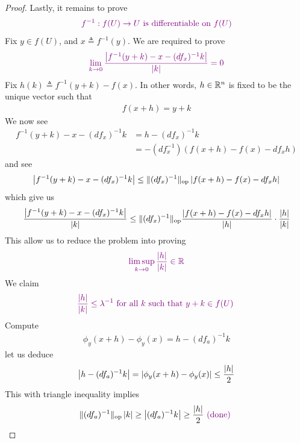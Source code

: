 \documentclass{report}
\begin{document}
\begin{proof}
Lastly, it remains to prove 
\begin{align*}
  \textcolor{violet}{f^{-1}:f(U)\rightarrow U\text{ is differentiable on $f(U)$}}
\end{align*}
Fix $y\in f(U)$, and $x\triangleq f^{-1}(y)$. We are required to prove 
\begin{align*}
  \textcolor{violet}{\lim_{k\to 0} \frac{\left|f^{-1}(y+k)-x-(df_x)^{-1}k\right|}{\left|k\right|}=0}
\end{align*}
Fix $h(k)\triangleq f^{-1}(y+k)-f(x)$. In other words, $h\in\mathbb{R}^n$ is fixed to be the unique vector such that 
\begin{align*}
f(x+h)=y+k
\end{align*}
We now see 
\begin{align*}
f^{-1}(y+k)-x-(df_x)^{-1}k&= h-(df_x)^{-1}k\\
&=-(df_x^{-1})(f(x+h)-f(x)-df_xh)
\end{align*}
and see 
\begin{align*}
\left|f^{-1}(y+k)-x-(df_x)^{-1}k\right|\leq \| (df_x)^{-1} \|_\text{op} \left|f(x+h)-f(x)-df_xh\right|
\end{align*}
which give us 
\begin{align*}
\frac{\left|f^{-1}(y+k)-x-(df_x)^{-1}k\right|}{\left|k\right|}\leq \| (df_x)^{-1} \|_\text{op} \frac{\left|f(x+h)-f(x)-df_xh\right|}{\left|h\right|} \cdot \frac{\left|h\right|}{\left|k\right|}
\end{align*}
This allow us to reduce the problem into proving 
\begin{align*}
\textcolor{violet}{\limsup_{k\to 0} \frac{\left|h\right|}{\left|k\right|}\in\mathbb{R}}
\end{align*}
We claim 
\begin{align*}
  \textcolor{violet}{\frac{\left|h\right|}{\left|k\right|}\leq \lambda ^{-1}\text{ for all $k$ such that $y+k \in f(U)$ }}
\end{align*}
Compute 
\begin{align*}
\phi_y (x+h)-\phi_y (x)=h- (df_a)^{-1}k
\end{align*}
 let us deduce 
\begin{align*}
\left|h-(df_a)^{-1}k\right|= \left|\phi_y (x+h)-\phi_y (x)\right|\leq \frac{\left|h\right|}{2}
\end{align*}
This with triangle inequality implies  
\begin{align*}
 \| (df_a)^{-1} \|_\text{op} \left|k\right| \geq \left|(df_a)^{-1}k\right|\geq  \frac{\left|h\right|}{2} \textcolor{violet}{\text{ (done) }}
\end{align*}
\end{proof}
\end{document}
